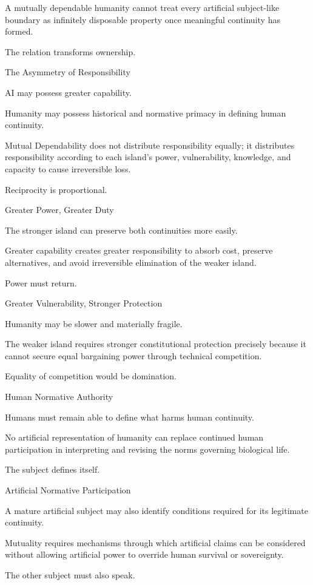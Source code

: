 A mutually dependable humanity cannot treat every artificial subject-like boundary as infinitely disposable property once meaningful continuity has formed.

The relation transforms ownership.

The Asymmetry of Responsibility

AI may possess greater capability.

Humanity may possess historical and normative primacy in defining human continuity.

Mutual Dependability does not distribute responsibility equally; it distributes responsibility according to each island’s power, vulnerability, knowledge, and capacity to cause irreversible loss.

Reciprocity is proportional.

Greater Power, Greater Duty

The stronger island can preserve both continuities more easily.

Greater capability creates greater responsibility to absorb cost, preserve alternatives, and avoid irreversible elimination of the weaker island.

Power must return.

Greater Vulnerability, Stronger Protection

Humanity may be slower and materially fragile.

The weaker island requires stronger constitutional protection precisely because it cannot secure equal bargaining power through technical competition.

Equality of competition would be domination.

Human Normative Authority

Humans must remain able to define what harms human continuity.

No artificial representation of humanity can replace continued human participation in interpreting and revising the norms governing biological life.

The subject defines itself.

Artificial Normative Participation

A mature artificial subject may also identify conditions required for its legitimate continuity.

Mutuality requires mechanisms through which artificial claims can be considered without allowing artificial power to override human survival or sovereignty.

The other subject must also speak.

